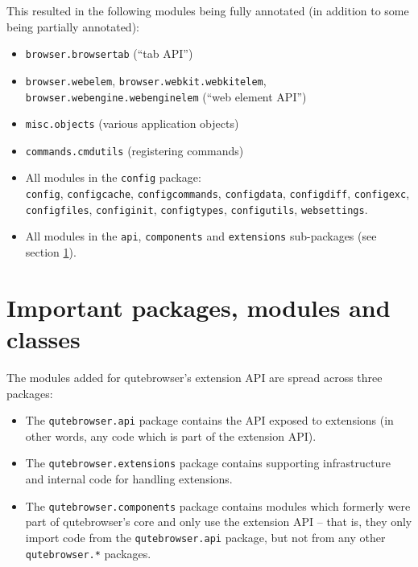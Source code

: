 This resulted in the following modules being fully annotated (in addition to
some being partially annotated):

\begin{itemize}[parsep=5pt]
  \item \texttt{browser.browsertab} (``tab API'')
  \item \texttt{browser.webelem}, \texttt{browser.webkit.webkitelem}, \\
    \texttt{browser.webengine.webenginelem} (``web element API'')
  \item \texttt{misc.objects} (various application objects)
  \item \texttt{commands.cmdutils} (registering commands)
  \item All modules in the \texttt{config} package: \\ \texttt{config}, \texttt{configcache},
    \texttt{configcommands}, \texttt{configdata}, \texttt{configdiff},
    \texttt{configexc}, \\ \texttt{configfiles}, \texttt{configinit}, \texttt{configtypes},
    \texttt{configutils}, \texttt{websettings}.
  \item All modules in the \texttt{api}, \texttt{components}
    and \texttt{extensions} sub-packages (see section \ref{sec:important}).
\end{itemize}


\section{Important packages, modules and classes}
\label{sec:important}
The modules added for qutebrowser's extension API are spread across three
packages:

\begin{itemize}
\item The \verb|qutebrowser.api| package contains the API exposed to
  extensions (in other words, any code which is part of the extension API).
\item The \verb|qutebrowser.extensions| package contains supporting infrastructure and
  internal code for handling extensions.
\item The \verb|qutebrowser.components| package contains modules which formerly
were part of qutebrowser's core and only use the extension API -- that is, they
only import code from the \verb|qutebrowser.api| package, but not from any
other \verb|qutebrowser.*| packages.
\end{itemize}

